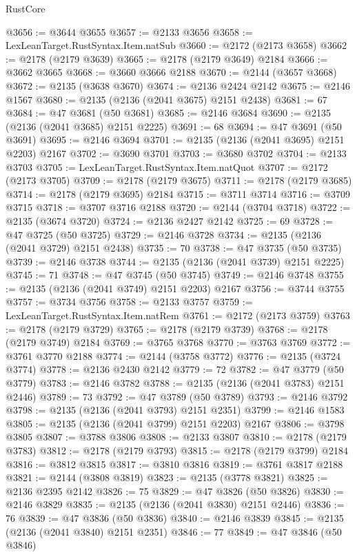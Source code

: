 \begin{lexlean}{RustCore}
\begin{coremodule}
@3656 := @3644 @3655
@3657 := @2133 @3656
@3658 := LexLeanTarget.RustSyntax.Item.natSub
@3660 := @2172 (@2173 @3658)
@3662 := @2178 (@2179 @3639)
@3665 := @2178 (@2179 @3649) @2184
@3666 := @3662 @3665
@3668 := @3660 @3666 @2188
@3670 := @2144 (@3657 @3668)
@3672 := @2135 (@3638 @3670)
@3674 := @2136 @2424 @2142
@3675 := @2146 @1567
@3680 := @2135 (@2136 (@2041 @3675) @2151 @2438)
@3681 := 67
@3684 := @47 @3681 (@50 @3681)
@3685 := @2146 @3684
@3690 := @2135 (@2136 (@2041 @3685) @2151 @2225)
@3691 := 68
@3694 := @47 @3691 (@50 @3691)
@3695 := @2146 @3694
@3701 := @2135 (@2136 (@2041 @3695) @2151 @2203) @2167
@3702 := @3690 @3701
@3703 := @3680 @3702
@3704 := @2133 @3703
@3705 := LexLeanTarget.RustSyntax.Item.natQuot
@3707 := @2172 (@2173 @3705)
@3709 := @2178 (@2179 @3675)
@3711 := @2178 (@2179 @3685)
@3714 := @2178 (@2179 @3695) @2184
@3715 := @3711 @3714
@3716 := @3709 @3715
@3718 := @3707 @3716 @2188
@3720 := @2144 (@3704 @3718)
@3722 := @2135 (@3674 @3720)
@3724 := @2136 @2427 @2142
@3725 := 69
@3728 := @47 @3725 (@50 @3725)
@3729 := @2146 @3728
@3734 := @2135 (@2136 (@2041 @3729) @2151 @2438)
@3735 := 70
@3738 := @47 @3735 (@50 @3735)
@3739 := @2146 @3738
@3744 := @2135 (@2136 (@2041 @3739) @2151 @2225)
@3745 := 71
@3748 := @47 @3745 (@50 @3745)
@3749 := @2146 @3748
@3755 := @2135 (@2136 (@2041 @3749) @2151 @2203) @2167
@3756 := @3744 @3755
@3757 := @3734 @3756
@3758 := @2133 @3757
@3759 := LexLeanTarget.RustSyntax.Item.natRem
@3761 := @2172 (@2173 @3759)
@3763 := @2178 (@2179 @3729)
@3765 := @2178 (@2179 @3739)
@3768 := @2178 (@2179 @3749) @2184
@3769 := @3765 @3768
@3770 := @3763 @3769
@3772 := @3761 @3770 @2188
@3774 := @2144 (@3758 @3772)
@3776 := @2135 (@3724 @3774)
@3778 := @2136 @2430 @2142
@3779 := 72
@3782 := @47 @3779 (@50 @3779)
@3783 := @2146 @3782
@3788 := @2135 (@2136 (@2041 @3783) @2151 @2446)
@3789 := 73
@3792 := @47 @3789 (@50 @3789)
@3793 := @2146 @3792
@3798 := @2135 (@2136 (@2041 @3793) @2151 @2351)
@3799 := @2146 @1583
@3805 := @2135 (@2136 (@2041 @3799) @2151 @2203) @2167
@3806 := @3798 @3805
@3807 := @3788 @3806
@3808 := @2133 @3807
@3810 := @2178 (@2179 @3783)
@3812 := @2178 (@2179 @3793)
@3815 := @2178 (@2179 @3799) @2184
@3816 := @3812 @3815
@3817 := @3810 @3816
@3819 := @3761 @3817 @2188
@3821 := @2144 (@3808 @3819)
@3823 := @2135 (@3778 @3821)
@3825 := @2136 @2395 @2142
@3826 := 75
@3829 := @47 @3826 (@50 @3826)
@3830 := @2146 @3829
@3835 := @2135 (@2136 (@2041 @3830) @2151 @2446)
@3836 := 76
@3839 := @47 @3836 (@50 @3836)
@3840 := @2146 @3839
@3845 := @2135 (@2136 (@2041 @3840) @2151 @2351)
@3846 := 77
@3849 := @47 @3846 (@50 @3846)

\end{coremodule}
\end{lexlean}
